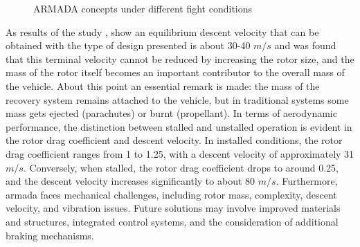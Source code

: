 \begin{figure}[!htb]
    \centering
    \hfill
    \caption{ARMADA concepts under different fight conditions}
    \label{fig:armada_windtunnel}
\end{figure}

As results of the study \cite{noauthor_armada_nodate}, show an equilibrium descent velocity that can be obtained with the type of design presented is about 30-40 $m/s$ and was found that this terminal velocity cannot be reduced by increasing the rotor size, and the mass of the rotor itself becomes an important contributor to the overall mass of the vehicle. About this point an essential remark is made:  the mass of the recovery system remains attached to the vehicle, but in traditional systems some mass gets ejected (parachutes) or burnt (propellant). In terms of aerodynamic performance, the distinction between stalled and unstalled operation is evident in the rotor drag coefficient and descent velocity. In installed conditions, the rotor drag coefficient ranges from 1 to 1.25, with a descent velocity of approximately 31 $m/s$. Conversely, when stalled, the rotor drag coefficient drops to around 0.25, and the descent velocity increases significantly to about 80 $m/s$. Furthermore, \gls{armada} faces mechanical challenges, including rotor mass, complexity, descent velocity, and vibration issues. Future solutions may involve improved materials and structures, integrated control systems, and the consideration of additional braking mechanisms.

